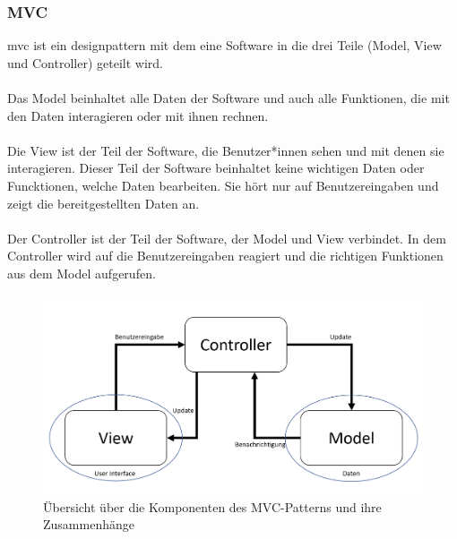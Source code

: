 \subsubsection{MVC}
\Gls{mvc} ist ein \Gls{designpattern} mit dem eine Software in die drei Teile (Model, View und Controller) geteilt wird.\\\\
Das Model beinhaltet alle Daten der Software und auch alle Funktionen, die mit den Daten interagieren oder mit ihnen rechnen.\\\\
Die View ist der Teil der Software, die Benutzer*innen sehen und mit denen sie interagieren. Dieser Teil der Software beinhaltet keine wichtigen Daten oder Funcktionen, welche Daten bearbeiten. Sie hört nur auf Benutzereingaben und zeigt die bereitgestellten Daten an.\\\\
Der Controller ist der Teil der Software, der Model und View verbindet. In dem Controller wird auf die Benutzereingaben reagiert und die richtigen Funktionen aus dem Model aufgerufen.\cite{mvc}
\begin{figure}[H]
	\centering
	\includegraphics[width=0.8\linewidth]{images/mvc}
	\caption[Übersicht des MVC-Patterns]{Übersicht über die Komponenten des MVC-Patterns und ihre Zusammenhänge}
	\label{fig:mvc}
\end{figure}
